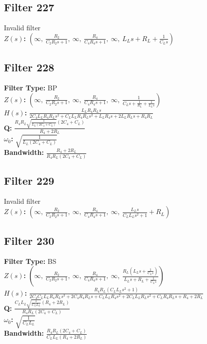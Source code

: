 \documentclass{article}
\begin{document}
\subsection*{Filter 227}
Invalid filter \\ 
\textbf{$Z(s)$:} $\left( \infty, \  \frac{R_{2}}{C_{2} R_{2} s + 1}, \  \infty, \  \frac{R_{4}}{C_{4} R_{4} s + 1}, \  \infty, \  L_{L} s + R_{L} + \frac{1}{C_{L} s}\right)$ \\ 
\subsection*{Filter 228}
\textbf{Filter Type:} BP \\ 
\textbf{$Z(s)$:} $\left( \infty, \  \frac{R_{2}}{C_{2} R_{2} s + 1}, \  \infty, \  \frac{R_{4}}{C_{4} R_{4} s + 1}, \  \infty, \  \frac{1}{C_{L} s + \frac{1}{R_{L}} + \frac{1}{L_{L} s}}\right)$ \\ 
\textbf{$H(s)$:} $\frac{L_{L} R_{4} R_{L} s}{2 C_{4} L_{L} R_{4} R_{L} s^{2} + C_{L} L_{L} R_{4} R_{L} s^{2} + L_{L} R_{4} s + 2 L_{L} R_{L} s + R_{4} R_{L}}$ \\ 
\textbf{Q:} $\frac{R_{4} R_{L} \sqrt{\frac{1}{L_{L} \left(2 C_{4} + C_{L}\right)}} \left(2 C_{4} + C_{L}\right)}{R_{4} + 2 R_{L}}$ \\ 
\textbf{$\omega_0$:} $\sqrt{\frac{1}{L_{L} \left(2 C_{4} + C_{L}\right)}}$ \\ 
\textbf{Bandwidth:} $\frac{R_{4} + 2 R_{L}}{R_{4} R_{L} \left(2 C_{4} + C_{L}\right)}$ \\ 
\subsection*{Filter 229}
Invalid filter \\ 
\textbf{$Z(s)$:} $\left( \infty, \  \frac{R_{2}}{C_{2} R_{2} s + 1}, \  \infty, \  \frac{R_{4}}{C_{4} R_{4} s + 1}, \  \infty, \  \frac{L_{L} s}{C_{L} L_{L} s^{2} + 1} + R_{L}\right)$ \\ 
\subsection*{Filter 230}
\textbf{Filter Type:} BS \\ 
\textbf{$Z(s)$:} $\left( \infty, \  \frac{R_{2}}{C_{2} R_{2} s + 1}, \  \infty, \  \frac{R_{4}}{C_{4} R_{4} s + 1}, \  \infty, \  \frac{R_{L} \left(L_{L} s + \frac{1}{C_{L} s}\right)}{L_{L} s + R_{L} + \frac{1}{C_{L} s}}\right)$ \\ 
\textbf{$H(s)$:} $\frac{R_{4} R_{L} \left(C_{L} L_{L} s^{2} + 1\right)}{2 C_{4} C_{L} L_{L} R_{4} R_{L} s^{3} + 2 C_{4} R_{4} R_{L} s + C_{L} L_{L} R_{4} s^{2} + 2 C_{L} L_{L} R_{L} s^{2} + C_{L} R_{4} R_{L} s + R_{4} + 2 R_{L}}$ \\ 
\textbf{Q:} $\frac{C_{L} L_{L} \sqrt{\frac{1}{C_{L} L_{L}}} \left(R_{4} + 2 R_{L}\right)}{R_{4} R_{L} \left(2 C_{4} + C_{L}\right)}$ \\ 
\textbf{$\omega_0$:} $\sqrt{\frac{1}{C_{L} L_{L}}}$ \\ 
\textbf{Bandwidth:} $\frac{R_{4} R_{L} \left(2 C_{4} + C_{L}\right)}{C_{L} L_{L} \left(R_{4} + 2 R_{L}\right)}$ \\ 
\end{document}
